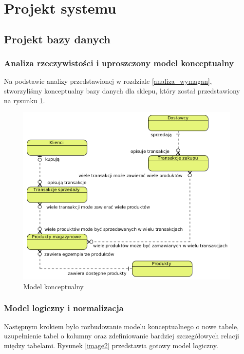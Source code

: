 \newpage
\section{Projekt systemu}
\subsection{Projekt bazy danych}
\subsubsection{Analiza rzeczywistości i uproszczony model konceptualny}

Na podstawie analizy przedstawionej w rozdziale \ref{analiza_wymagan}, stworzyliśmy konceptualny bazy danych dla sklepu, który został przedstawiony na rysunku \ref{image1}.

\begin{figure}[h]
	\centering
	\includegraphics[width=0.8\linewidth]{images/image1.png}
	\caption{Model konceptualny}
	\label{image1}
\end{figure}

\newpage
\subsubsection{Model logiczny i normalizacja}

Następnym krokiem było rozbudowanie modelu konceptualnego o nowe tabele, uzupełnienie tabel o kolumny oraz zdefiniowanie bardziej szczegółowych relacji między tabelami. Rysunek \ref{image2} przedstawia gotowy model logiczny.

